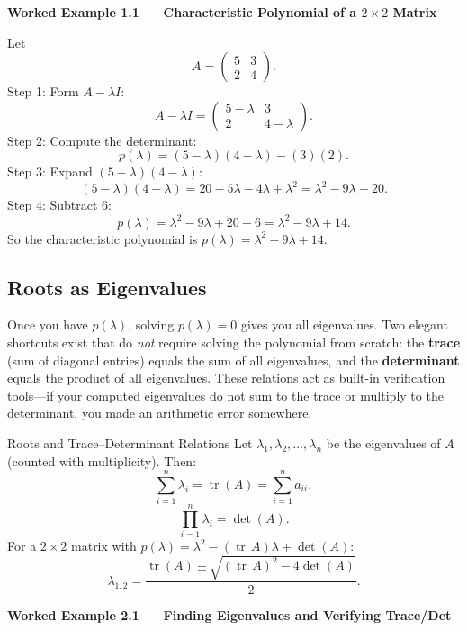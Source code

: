 \documentclass[12pt,a4paper]{article}
\begin{document}
\textbf{Worked Example 1.1 --- Characteristic Polynomial of a $2\times 2$ Matrix}

Let
\[
  A = \begin{pmatrix} 5 & 3 \\ 2 & 4 \end{pmatrix}.
\]
Step 1: Form $A - \lambda I$:
\[
  A - \lambda I = \begin{pmatrix} 5-\lambda & 3 \\ 2 & 4-\lambda \end{pmatrix}.
\]
Step 2: Compute the determinant:
\[
  p(\lambda) = (5-\lambda)(4-\lambda) - (3)(2).
\]
Step 3: Expand $(5-\lambda)(4-\lambda)$:
\[
  (5-\lambda)(4-\lambda) = 20 - 5\lambda - 4\lambda + \lambda^2 = \lambda^2 - 9\lambda + 20.
\]
Step 4: Subtract $6$:
\[
  p(\lambda) = \lambda^2 - 9\lambda + 20 - 6 = \lambda^2 - 9\lambda + 14.
\]
So the characteristic polynomial is $p(\lambda) = \lambda^2 - 9\lambda + 14$.

\subsection{Roots as Eigenvalues}

Once you have $p(\lambda)$, solving $p(\lambda)=0$ gives you all eigenvalues.
Two elegant shortcuts exist that do \emph{not} require solving the polynomial from scratch:
the \textbf{trace} (sum of diagonal entries) equals the sum of all eigenvalues, and the
\textbf{determinant} equals the product of all eigenvalues.
These relations act as built-in verification tools---if your computed eigenvalues do not
sum to the trace or multiply to the determinant, you made an arithmetic error somewhere.

\begin{infobox}{Roots and Trace--Determinant Relations}
Let $\lambda_1, \lambda_2, \ldots, \lambda_n$ be the eigenvalues of $A$ (counted with multiplicity). Then:
\[
  \sum_{i=1}^{n} \lambda_i = \operatorname{tr}(A) = \sum_{i=1}^{n} a_{ii},
\]
\[
  \prod_{i=1}^{n} \lambda_i = \det(A).
\]
For a $2\times 2$ matrix with $p(\lambda) = \lambda^2 - (\operatorname{tr}\, A)\lambda + \det(A)$:
\[
  \lambda_{1,2} = \frac{\operatorname{tr}(A) \pm \sqrt{(\operatorname{tr}\,A)^2 - 4\det(A)}}{2}.
\]
\end{infobox}

\textbf{Worked Example 2.1 --- Finding Eigenvalues and Verifying Trace/Det}
\end{document}
